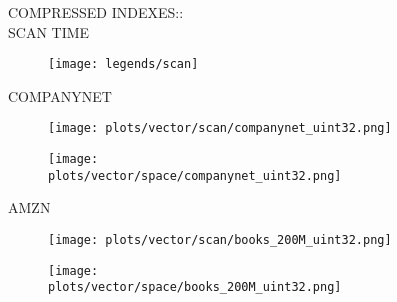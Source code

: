 \documentclass{article}
\begin{document}
\begin{figure}[!htbp]
\fbox
{
\begin{minipage}[t][0.98\textheight][t]{\textwidth}
\centering
\vspace*{-0.7cm}
    \begin{minipage}{0.23\linewidth}
    \footnotesize{COMPRESSED INDEXES::\\ SCAN TIME}
    \end{minipage}
   \begin{minipage}{0.75\linewidth}
        \begin{figure}[H]
        \texttt{[image: legends/scan]}
        \end{figure}
    \end{minipage}
    \vspace*{-20px} 

    \begin{minipage}{0.03\linewidth}
    \begin{sideways}\small COMPANYNET\end{sideways}
    \end{minipage}
    \begin{minipage}{0.32\linewidth}
        \begin{figure}[H]
        \texttt{[image: plots/vector/scan/companynet\_uint32.png]}
        \end{figure}
    \end{minipage}
    \begin{minipage}{0.32\linewidth}
        \begin{figure}[H]
            \texttt{[image: plots/vector/space/companynet\_uint32.png]}
        \end{figure}
    \end{minipage}
     \vspace*{-15px}

    \begin{minipage}{0.03\linewidth}
    \begin{sideways}\small AMZN\end{sideways}
    \end{minipage}
    \begin{minipage}{0.32\linewidth}
        \begin{figure}[H]
        \texttt{[image: plots/vector/scan/books\_200M\_uint32.png]}
        \end{figure}
    \end{minipage}
    \begin{minipage}{0.32\linewidth}
        \begin{figure}[H]
            \texttt{[image: plots/vector/space/books\_200M\_uint32.png]}
        \end{figure}
    \end{minipage}
     \vspace*{-15px}


\end{minipage}}
\end{figure}
\end{document}
